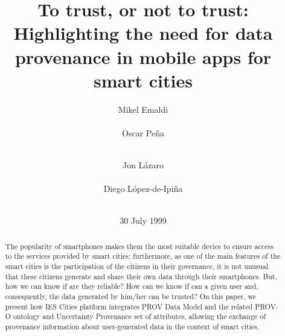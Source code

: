 \documentclass{vldb}
\begin{document}
\title{To trust, or not to trust: Highlighting the need for data provenance in mobile apps for smart cities}


\author{
\alignauthor
Mikel Emaldi\\
       \\
\alignauthor
Oscar Peña\\
       \\
\and
\alignauthor
Jon Lázaro\\
       \\
\alignauthor
Diego López-de-Ipiña\\
       \\
}

\date{30 July 1999}

\maketitle

\begin{abstract}
The popularity of smartphones makes them the most suitable device to ensure access to the services provided by smart cities; furthermore, as one of the main features of the smart cities is the participation of the citizens in their governance, it is not unusual that these citizens generate and share their own data through their smartphones. But, how we can know if are they reliable? How can we know if can a given user and, consequently, the data generated by him/her can be trusted? On this paper, we present how IES Cities platform integrates PROV Data Model and the related PROV-O ontology and Uncertainty Provenance set of attributes, allowing the exchange of provenance information about user-generated data in the context of smart cities.

\end{abstract}










\end{document}
